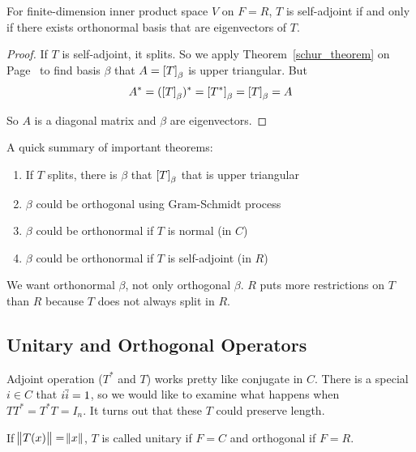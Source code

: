 \begin{theorem}
    For finite-dimension inner product space $V$ on $F=R$, $T$ is self-adjoint if and only if there exists orthonormal basis that are eigenvectors of $T$.
\end{theorem}
\begin{proof}
    If $T$ is self-adjoint, it splits. So we apply Theorem~\ref{schur_theorem} on Page~\pageref{schur_theorem} to find basis $\beta$ that $A = \coordinate{T}_\beta$ is upper triangular. But
    \begin{equation*}
        A^* = (\coordinate{T}_\beta)^* = \coordinate{T^*}_\beta = \coordinate{T}_\beta = A
    \end{equation*}
    
    So $A$ is a diagonal matrix and $\beta$ are eigenvectors.
\end{proof}

A quick summary of important theorems:
\begin{enumerate}
    \item If $T$ splits, there is $\beta$ that $\coordinate{T}_\beta$ that is upper triangular
    \item $\beta$ could be orthogonal using Gram-Schmidt process
    \item $\beta$ could be orthonormal if $T$ is normal (in $C$)
    \item $\beta$ could be orthonormal if $T$ is self-adjoint (in $R$)
\end{enumerate}

We want orthonormal $\beta$, not only orthogonal $\beta$. $R$ puts more restrictions on $T$ than $R$ because $T$ does not always split in $R$.



\subsection{Unitary and Orthogonal Operators}

Adjoint operation ($T^*$ and $T$) works pretty like conjugate in $C$. There is a special $i \in C$  that $i \overline{i} = 1$, so we would like to examine what happens when $TT^* = T^* T = I_n$. It turns out that these $T$ could preserve length.

\begin{definition}
    If $\norm{T(x)} = \norm{x}$, $T$ is called unitary if $F=C$ and orthogonal if $F=R$.
\end{definition}
